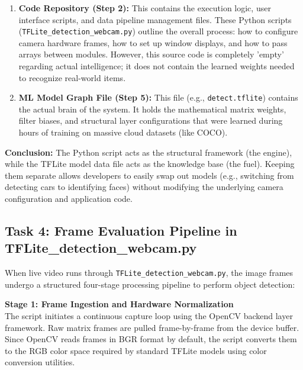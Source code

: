 \documentclass[12pt,a4paper]{article}
\begin{document}
\begin{enumerate}[label=\textbf{\arabic*.}]
    \item \textbf{Code Repository (Step 2):} This contains the execution logic, user interface scripts, and data pipeline management files. These Python scripts (\texttt{TFLite\_detection\_webcam.py}) outline the overall process: how to configure camera hardware frames, how to set up window displays, and how to pass arrays between modules. However, this source code is completely 'empty' regarding actual intelligence; it does not contain the learned weights needed to recognize real-world items.
    
    \item \textbf{ML Model Graph File (Step 5):} This file (e.g., \texttt{detect.tflite}) contains the actual brain of the system. It holds the mathematical matrix weights, filter biases, and structural layer configurations that were learned during hours of training on massive cloud datasets (like COCO).
\end{enumerate}

\noindent \textbf{Conclusion:} The Python script acts as the structural framework (the engine), while the TFLite model data file acts as the knowledge base (the fuel). Keeping them separate allows developers to easily swap out models (e.g., switching from detecting cars to identifying faces) without modifying the underlying camera configuration and application code.

\vspace{0.8cm}

\subsection*{Task 4: Frame Evaluation Pipeline in TFLite\_detection\_webcam.py}

When live video runs through \texttt{TFLite\_detection\_webcam.py}, the image frames undergo a structured four-stage processing pipeline to perform object detection:

\vspace{0.3cm}

\noindent \textbf{Stage 1: Frame Ingestion and Hardware Normalization}\\
The script initiates a continuous capture loop using the OpenCV backend layer framework. Raw matrix frames are pulled frame-by-frame from the device buffer. Since OpenCV reads frames in BGR format by default, the script converts them to the RGB color space required by standard TFLite models using color conversion utilities.
\end{document}
